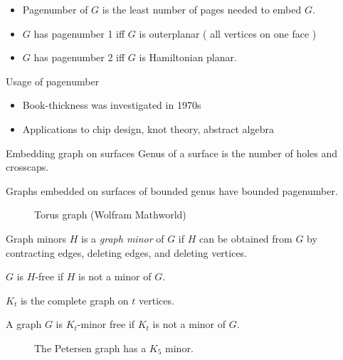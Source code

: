 \documentclass[]{beamer}
\begin{document}
\begin{frame}
	\begin{itemize}
		\item Pagenumber of $G$ is the least number of pages needed to embed $G$.
		\item $G$ has pagenumber 1 iff $G$ is outerplanar ( all vertices on one face )
		\item $G$ has pagenumber 2 iff $G$ is Hamiltonian planar.
	\end{itemize}
\end{frame}

\begin{frame}{Usage of pagenumber}
	\begin{itemize}
		\item Book-thickness was investigated in 1970s
		\item Applications to chip design, knot theory, abstract algebra
	\end{itemize}
\end{frame}

\begin{frame}{Embedding graph on surfaces}
	Genus of a surface is the number of holes and crosscaps. 
	\begin{theorem}
		Graphs embedded on surfaces of bounded genus have bounded pagenumber.
	\end{theorem}
	\begin{figure}[h]
		
		\caption{Torus graph (Wolfram Mathworld)}
	\end{figure}
\end{frame}

\begin{frame}{Graph minors}
	$H$ is a \textit{graph minor} of $G$ if $H$ can be obtained from $G$ by contracting edges, deleting edges, and deleting vertices.
	
	$G$ is $H$-free if $H$ is not a minor of $G$. 
\end{frame}

\begin{frame}
	$K_t$ is the complete graph on $t$ vertices.
	\begin{definition}
		A graph $G$ is $K_t$-minor free if $K_t$ is not a minor of $G$.
	\end{definition}
	\begin{figure}[h]
		\centering
		
		
		\caption{The Petersen graph has a $K_5$ minor.}\label{P10contraction}
	\end{figure}
\end{frame}
\end{document}
